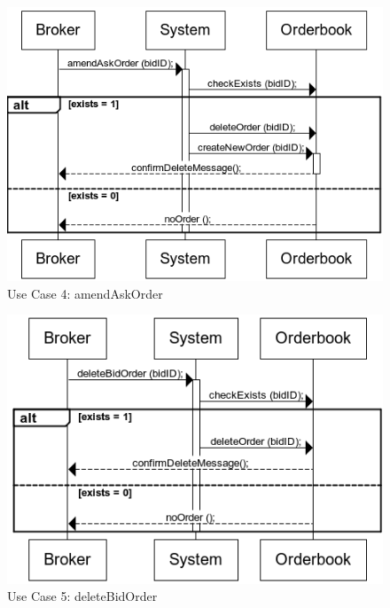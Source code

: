 \documentclass[a4paper]{article}
\begin{document}
\begin{figure}[H]
   \includegraphics[width=1\textwidth]{images/amendAskOrder}
   \caption{Use Case 4: amendAskOrder}
\end{figure}

\begin{figure}[H]
   \includegraphics[width=1\textwidth]{images/deleteBidOrder}
   \caption{Use Case 5: deleteBidOrder}
\end{figure}
\end{document}

